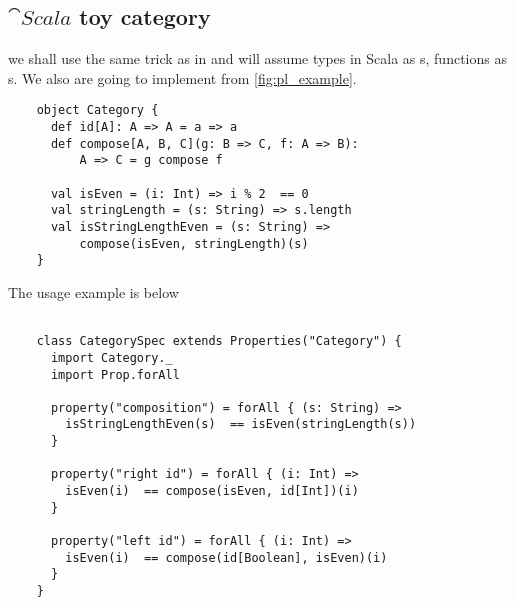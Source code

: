 \subsection{$\cat{Scala}$ toy category}
\begin{example}
  \label{ex:scalacategory}

  we shall use the same trick as in  and
  will assume 
  types in Scala as s, 
  functions as s.
  We also are going to implement
   from \cref{fig:pl_example}.

  \begin{verbatim}
    object Category {
      def id[A]: A => A = a => a
      def compose[A, B, C](g: B => C, f: A => B): 
          A => C = g compose f 
      
      val isEven = (i: Int) => i % 2  == 0
      val stringLength = (s: String) => s.length
      val isStringLengthEven = (s: String) => 
          compose(isEven, stringLength)(s)
    }
  \end{verbatim}

  The usage example is below
  \begin{verbatim}
    
    class CategorySpec extends Properties("Category") {
      import Category._
      import Prop.forAll
      
      property("composition") = forAll { (s: String) =>
        isStringLengthEven(s)  == isEven(stringLength(s))
      }
      
      property("right id") = forAll { (i: Int) =>
        isEven(i)  == compose(isEven, id[Int])(i)
      }
      
      property("left id") = forAll { (i: Int) =>
        isEven(i)  == compose(id[Boolean], isEven)(i)
      }
    }
  \end{verbatim}
\end{example}

